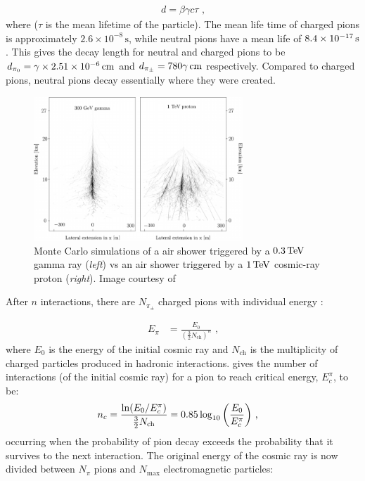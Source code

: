 \begin{equation}
    \begin{aligned}
    d=\beta \gamma c \tau \text{ ,}
    \end{aligned}
\end{equation}
\noindent where ($\tau$ is the mean lifetime of the particle). The mean life time of charged pions is approximately $2.6\times 10^{-8}\,\si{\second}$, while neutral pions have a mean life of $8.4\times 10^{-17}\,\si{\second}$. This gives the decay length for neutral and charged pions to be $d_{\pi_0}=\gamma \times  2.51 \times 10^{-6}\,\si{\centi\meter}$ and $d_{\pi_\pm}= 780\gamma\,\si{\centi\meter}$ respectively. Compared to charged pions, neutral pions decay essentially where they were created.
\begin{figure}
    \centering
    \includegraphics[width=0.7\textwidth]{05_Astronomy/Images/air_shower/cosmic_ray_vs_gamma_ray2.pdf}
    \caption{Monte Carlo simulations of a air shower triggered by a $0.3\,\TeV$ gamma ray (\textit{left}) vs an air shower triggered by a $1\,\TeV$ cosmic-ray proton (\textit{right}). Image courtesy of \cite{2008RPPh...71i6901A}}
    \label{fig:chapter_2_air_shower2}
\end{figure}
\newpar 
After $n$ interactions, there are $N_{\pi_\pm}$ charged pions with individual energy \citep{MATTHEWS2005387}:

\begin{equation}
    \begin{aligned}
    E_\pi &=\frac{E_0}{(\frac{3}{2}N_\text{ch})^n}\text{ ,}
    \end{aligned}
\end{equation}
\noindent where $E_0$ is the energy of the initial cosmic ray and $N_\text{ch}$ is the multiplicity of charged particles produced in hadronic interactions.
\newpar
\cite{MATTHEWS2005387} gives the number of interactions (of the initial cosmic ray) for a pion to reach critical energy, $E_c^\pi$, to be:
\begin{equation}
    \begin{aligned}
    n_c&=\frac{\ln(E_0/E_c^\pi)}{\frac{3}{2}N_\text{ch}}=0.85\log_{10}\qty(\frac{E_0}{E_c^\pi}) \text{ ,}
    \end{aligned}
\end{equation}
\noindent occurring when the probability of pion decay exceeds the probability that it survives to the next interaction. The original energy of the cosmic ray is now divided between $N_\pi$ pions and $N_\text{max}$ electromagnetic particles:

